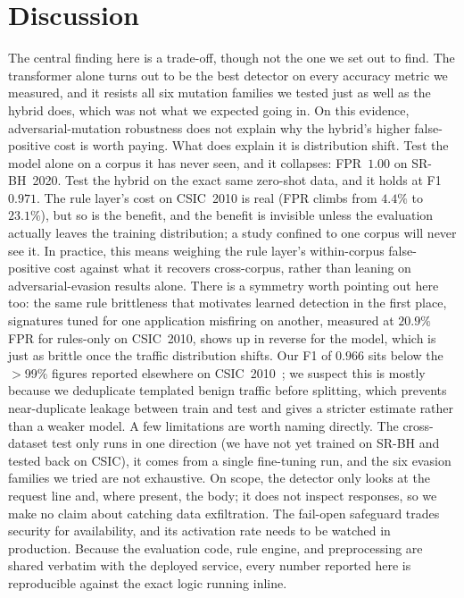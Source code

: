 \documentclass[conference]{IEEEtran}
\begin{document}
\section{Discussion}
The central finding here is a trade-off, though not the one we set out to
find. The transformer alone turns out to be the best detector on every
accuracy metric we measured, and it resists all six mutation families we
tested just as well as the hybrid does, which was not what we expected
going in. On this evidence, adversarial-mutation robustness does not
explain why the hybrid's higher false-positive cost is worth paying. What
does explain it is distribution shift. Test the model alone on a corpus it
has never seen, and it collapses: FPR~$1.00$ on SR-BH~2020. Test the hybrid
on the exact same zero-shot data, and it holds at F1~$0.971$. The rule
layer's cost on CSIC~2010 is real (FPR climbs from $4.4\%$ to $23.1\%$), but
so is the benefit, and the benefit is invisible unless the evaluation
actually leaves the training distribution; a study confined to one
corpus will never see it. In practice, this means weighing the rule layer's
within-corpus false-positive cost against what it recovers cross-corpus,
rather than leaning on adversarial-evasion results alone. There is a
symmetry worth pointing out here too: the same rule brittleness that
motivates learned detection in the first place, signatures tuned for one
application misfiring on another, measured at $20.9\%$ FPR for
rules-only on CSIC~2010, shows up in reverse for the model, which is
just as brittle once
the traffic distribution shifts. Our F1 of $0.966$ sits below the $>$99\%
figures reported elsewhere on
CSIC~2010~\cite{wadbert2026,scireports2024novelxsssqli}; we suspect this is
mostly because we deduplicate templated benign traffic before splitting,
which prevents near-duplicate leakage between train and test and gives a
stricter estimate rather than a weaker model. A few limitations are worth
naming directly. The cross-dataset test only runs in one direction (we
have not yet trained on SR-BH and tested back on CSIC), it comes from a
single fine-tuning run, and the six evasion families we tried are not
exhaustive.
On scope, the detector only looks at the request line and, where present,
the body; it does not inspect responses, so we make no claim about catching
data exfiltration. The fail-open safeguard trades security for availability,
and its activation rate needs to be watched in production. Because the
evaluation code, rule engine, and preprocessing are shared verbatim with the
deployed service, every number reported here is reproducible against the
exact logic running inline.
\end{document}
